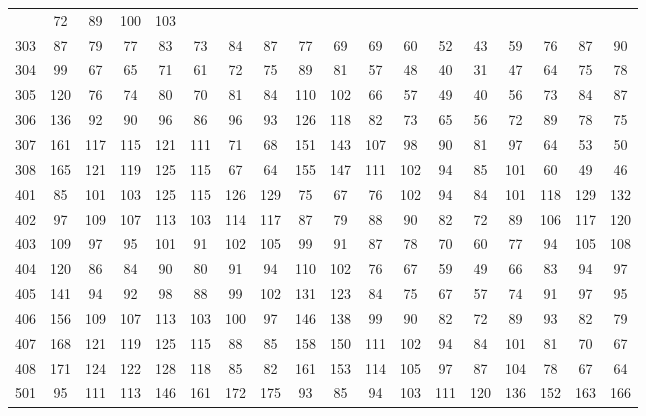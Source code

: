 \begin{table}[htbp]
\begin{center}
{\begin{tabular}{lccccccccccccccccc}
						       & 72 & 89 & 100 &
								       103 \\
303 & 87 & 79 & 77 & 83 & 73 & 84 & 87 & 77 & 69 & 69 & 60 & 52 & 43
						       & 59 & 76 & 87 &
								       90 \\
304 & 99 & 67 & 65 & 71 & 61 & 72 & 75 & 89 & 81 & 57 & 48 & 40 & 31
						       & 47 & 64 & 75 &
								       78 \\
305 & 120 & 76 & 74 & 80 & 70 & 81 & 84 & 110 & 102 & 66 & 57 & 49 &
						       40 & 56 & 73 & 84
								   & 87 \\
306 & 136 & 92 & 90 & 96 & 86 & 96 & 93 & 126 & 118 & 82 & 73 & 65 &
						       56 & 72 & 89 & 78
								   & 75 \\
307 & 161 & 117 & 115 & 121 & 111 & 71 & 68 & 151 & 143 & 107 & 98 &
						   90 & 81 & 97 & 64 &
								   53 &
								       50 \\
308 & 165 & 121 & 119 & 125 & 115 & 67 & 64 & 155 & 147 & 111 & 102 &
						   94 & 85 & 101 & 60 &
								   49 &
								       46 \\
401 & 85 & 101 & 103 & 125 & 115 & 126 & 129 & 75 & 67 & 76 & 102 &
						   94 & 84 & 101 & 118 &
								   129 &
								       132 \\
402 & 97 & 109 & 107 & 113 & 103 & 114 & 117 & 87 & 79 & 88 & 90 & 82
						   & 72 & 89 & 106 & 117
								   & 120 \\
403 & 109 & 97 & 95 & 101 & 91 & 102 & 105 & 99 & 91 & 87 & 78 & 70 &
						       60 & 77 & 94 &
								   105 &
								       108 \\
404 & 120 & 86 & 84 & 90 & 80 & 91 & 94 & 110 & 102 & 76 & 67 & 59 &
						       49 & 66 & 83 & 94
								   & 97 \\
405 & 141 & 94 & 92 & 98 & 88 & 99 & 102 & 131 & 123 & 84 & 75 & 67 &
						       57 & 74 & 91 & 97
								   & 95 \\
406 & 156 & 109 & 107 & 113 & 103 & 100 & 97 & 146 & 138 & 99 & 90 &
						   82 & 72 & 89 & 93 &
								   82 &
								       79 \\
407 & 168 & 121 & 119 & 125 & 115 & 88 & 85 & 158 & 150 & 111 & 102 &
						   94 & 84 & 101 & 81 &
								   70 &
								       67 \\
408 & 171 & 124 & 122 & 128 & 118 & 85 & 82 & 161 & 153 & 114 & 105 &
						   97 & 87 & 104 & 78 &
								   67 &
								       64 \\
501 & 95 & 111 & 113 & 146 & 161 & 172 & 175 & 93 & 85 & 94 & 103 &
						   111 & 120 & 136 & 152
							       & 163 &
								       166 \\

\end{tabular}}
\end{center}
\end{table}
